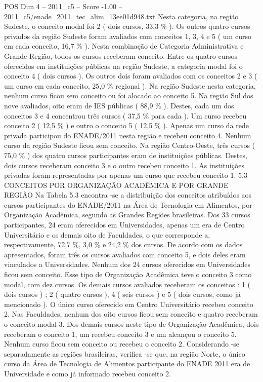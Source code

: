\begin{textsample}{POS Dim 4 – 2011\_c5 – Score -1.00 – 2011\_c5/enade\_2011\_tec\_alim\_13ee01d948.txt}
Nesta categoria, na região Sudeste, o conceito modal foi 2 ( dois cursos, 33,3 \% ).
Os outros quatro cursos privados da região Sudeste foram avaliados com conceitos 1, 3, 4 e 5 ( um curso em cada conceito, 16,7 \% ).
Nesta combinação de Categoria Administrativa e Grande Região, todos os cursos receberam conceito.
Entre os quatro cursos oferecidos em instituições públicas na região Sudeste, a categoria modal foi o conceito 4 ( dois cursos ).
Os outros dois foram avaliados com os conceitos 2 e 3 ( um curso em cada conceito, 25,0 \% regional ).
Na região Sudeste nesta categoria, nenhum curso ficou sem conceito ou foi alocado ao conceito 5.
Na região Sul dos nove avaliados, oito eram de IES públicas ( 88,9 \% ).
Destes, cada um dos conceitos 3 e 4 concentrou três cursos ( 37,5 \% para cada ).
Um curso recebeu conceito 2 ( 12,5 \% ) e outro o conceito 5 ( 12,5 \% ).
Apenas um curso da rede privada participou do ENADE/2011 nesta região e recebeu conceito 4.
Nenhum curso da região Sudeste ficou sem conceito.
Na região Centro-Oeste, três cursos ( 75,0 \% ) dos quatro cursos participantes eram de instituições públicas.
Destes, dois cursos receberam conceito 3 e o outro recebeu conceito 1.
As instituições privadas foram representadas por apenas um curso que recebeu conceito 1. 5.3 CONCEITOS POR ORGANIZAÇÃO ACADÊMICA E POR GRANDE REGIÃO Na Tabela 5.3 encontra -se a distribuição dos conceitos atribuídos aos cursos participantes do ENADE/2011 na Área de Tecnologia em Alimentos, por Organização Acadêmica, segundo as Grandes Regiões brasileiras.
Dos 33 cursos participantes, 24 eram oferecidos em Universidades, apenas um era de Centro Universitário e os demais oito de Faculdades, o que corresponde a, respectivamente, 72,7 \%, 3,0 \% e 24,2 \% dos cursos.
De acordo com os dados apresentados, foram três os cursos avaliados com conceito 5, e dois deles eram vinculados a Universidades.
Nenhum dos 24 cursos oferecidos em Universidades ficou sem conceito.
Esse tipo de Organização Acadêmica teve o conceito 3 como modal, com dez cursos.
Os demais cursos avaliados receberam os conceitos : 1 ( dois cursos ) ; 2 ( quatro cursos ), 4 ( seis cursos ) e 5 ( dois cursos, como já mencionado ).
O único curso oferecido em Centro Universitário recebeu conceito 2.
Nas Faculdades, nenhum dos oito cursos ficou sem conceito e quatro receberam o conceito modal 3.
Dos demais cursos neste tipo de Organização Acadêmica, dois receberam o conceito 1, um recebeu conceito 3 e um alcançou o conceito 5.
Nenhum curso ficou sem conceito ou recebeu o conceito 2.
Considerando -se separadamente as regiões brasileiras, verifica -se que, na região Norte, o único curso da Área de Tecnologia de Alimentos participante do ENADE 2011 era de Universidade e como já informado recebeu conceito 2.

\end{textsample}
